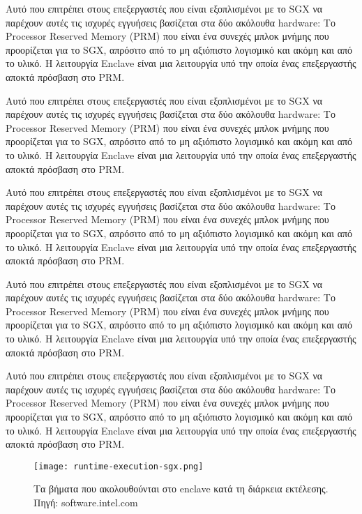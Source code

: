 Αυτό που επιτρέπει στους επεξεργαστές που είναι εξοπλισμένοι με το SGX να παρέχουν αυτές τις ισχυρές εγγυήσεις βασίζεται στα δύο ακόλουθα hardware: Το Processor Reserved Memory (PRM) που είναι ένα συνεχές μπλοκ μνήμης που προορίζεται για το SGX, απρόσιτο από το μη αξιόπιστο λογισμικό και ακόμη και από το υλικό. Η λειτουργία Enclave είναι μια λειτουργία υπό την οποία ένας επεξεργαστής αποκτά πρόσβαση στο PRM.

Αυτό που επιτρέπει στους επεξεργαστές που είναι εξοπλισμένοι με το SGX να παρέχουν αυτές τις ισχυρές εγγυήσεις βασίζεται στα δύο ακόλουθα hardware: Το Processor Reserved Memory (PRM) που είναι ένα συνεχές μπλοκ μνήμης που προορίζεται για το SGX, απρόσιτο από το μη αξιόπιστο λογισμικό και ακόμη και από το υλικό. Η λειτουργία Enclave είναι μια λειτουργία υπό την οποία ένας επεξεργαστής αποκτά πρόσβαση στο PRM.

Αυτό που επιτρέπει στους επεξεργαστές που είναι εξοπλισμένοι με το SGX να παρέχουν αυτές τις ισχυρές εγγυήσεις βασίζεται στα δύο ακόλουθα hardware: Το Processor Reserved Memory (PRM) που είναι ένα συνεχές μπλοκ μνήμης που προορίζεται για το SGX, απρόσιτο από το μη αξιόπιστο λογισμικό και ακόμη και από το υλικό. Η λειτουργία Enclave είναι μια λειτουργία υπό την οποία ένας επεξεργαστής αποκτά πρόσβαση στο PRM.

Αυτό που επιτρέπει στους επεξεργαστές που είναι εξοπλισμένοι με το SGX να παρέχουν αυτές τις ισχυρές εγγυήσεις βασίζεται στα δύο ακόλουθα hardware: Το Processor Reserved Memory (PRM) που είναι ένα συνεχές μπλοκ μνήμης που προορίζεται για το SGX, απρόσιτο από το μη αξιόπιστο λογισμικό και ακόμη και από το υλικό. Η λειτουργία Enclave είναι μια λειτουργία υπό την οποία ένας επεξεργαστής αποκτά πρόσβαση στο PRM.

Αυτό που επιτρέπει στους επεξεργαστές που είναι εξοπλισμένοι με το SGX να παρέχουν αυτές τις ισχυρές εγγυήσεις βασίζεται στα δύο ακόλουθα hardware: Το Processor Reserved Memory (PRM) που είναι ένα συνεχές μπλοκ μνήμης που προορίζεται για το SGX, απρόσιτο από το μη αξιόπιστο λογισμικό και ακόμη και από το υλικό. Η λειτουργία Enclave είναι μια λειτουργία υπό την οποία ένας επεξεργαστής αποκτά πρόσβαση στο PRM.


\begin{figure}[H]
\centering
  \texttt{[image: runtime-execution-sgx.png]}
  \caption{Τα βήματα που ακολουθούνται στο enclave κατά τη διάρκεια εκτέλεσης. Πηγή: software.intel.com }
  \label{fig:runtime_exetutionsgx}
\end{figure}

